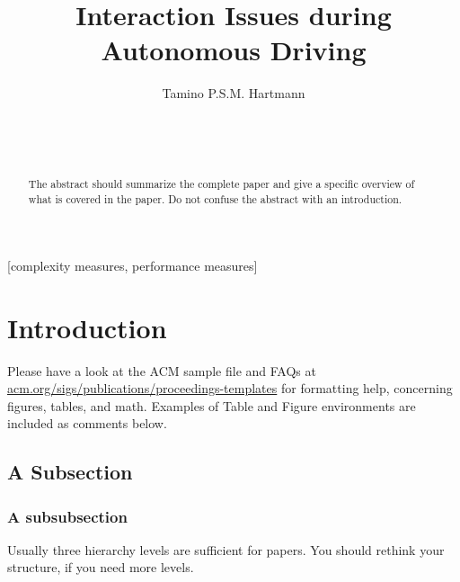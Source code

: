 \documentclass{acm_proc_article-sp}
\begin{document}

\title{Interaction Issues during Autonomous Driving}

\author{
\alignauthor
Tamino P.S.M. Hartmann\\
       \\
       \\
       \\
}

\maketitle
\begin{abstract}
The abstract should summarize the complete paper and give a specific overview of what is covered in the paper. Do not confuse the abstract with an introduction.
\end{abstract}

[complexity measures, performance measures]


\section{Introduction}
Please have a look at the ACM sample file and FAQs at \url{acm.org/sigs/publications/proceedings-templates} for formatting help, concerning figures, tables, and math. Examples of Table and Figure environments are included as comments below.

\subsection{A Subsection}

\subsubsection{A subsubsection}
Usually three hierarchy levels are sufficient for papers. You should rethink your structure, if you need more levels.
\end{document}
